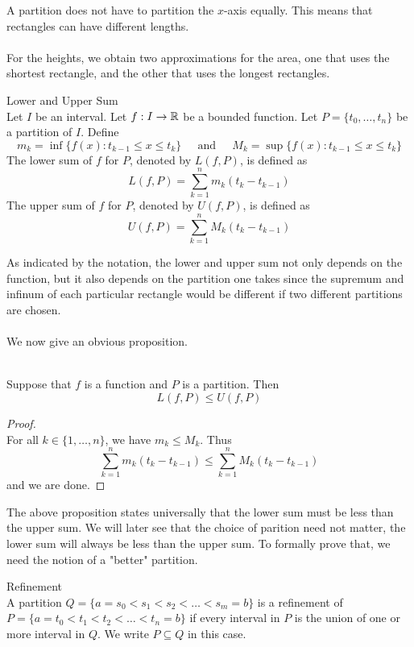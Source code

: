 \documentclass[a4paper]{article}
\begin{document}
A partition does not have to partition the $x$-axis equally. This means that rectangles can have different lengths. \\~\\
For the heights, we obtain two approximations for the area, one that uses the shortest rectangle, and the other that uses the longest rectangles. 

\begin{defn}{Lower and Upper Sum}{}\\
Let $I$ be an interval. Let $f:I\to\mathbb{R}$ be a bounded function. Let $P=\{t_0,\dots,t_n\}$ be a partition of $I$. Define $$m_k=\inf\{f(x):t_{k-1}\leq x\leq t_k\}\;\;\;\;\text{ and }\;\;\;\;M_k=\sup\{f(x):t_{k-1}\leq x\leq t_k\}$$ The lower sum of $f$ for $P$, denoted by $L(f,P)$, is defined as $$L(f,P)=\sum_{k=1}^nm_k(t_k-t_{k-1})$$ The upper sum of $f$ for $P$, denoted by $U(f,P)$, is defined as $$U(f,P)=\sum_{k=1}^nM_k(t_k-t_{k-1})$$
\end{defn}

As indicated by the notation, the lower and upper sum not only depends on the function, but it also depends on the partition one takes since the supremum and infinum of each particular rectangle would be different if two different partitions are chosen. \\~\\
We now give an obvious proposition. 

\begin{prp}{}{}\\ Suppose that $f$ is a function and $P$ is a partition. Then $$L(f,P)\leq U(f,P)$$ 
\begin{proof}\\ For all $k\in\{1,\dots,n\}$, we have $m_k\leq M_k$. Thus $$\sum_{k=1}^nm_k(t_k-t_{k-1})\leq\sum_{k=1}^nM_k(t_k-t_{k-1})$$ and we are done. 
\end{proof}
\end{prp}

The above proposition states universally that the lower sum must be less than the upper sum. We will later see that the choice of parition need not matter, the lower sum will always be less than the upper sum. To formally prove that, we need the notion of a "better" partition. 

\begin{defn}{Refinement}{}\\ A partition $Q=\{a=s_0<s_1<s_2<\dots<s_m=b\}$ is a refinement of $P=\{a=t_0<t_1<t_2<\dots<t_n=b\}$ if every interval in $P$ is the union of one or more interval in $Q$. We write $P\subseteq Q$ in this case. 
\end{defn}
\end{document}
